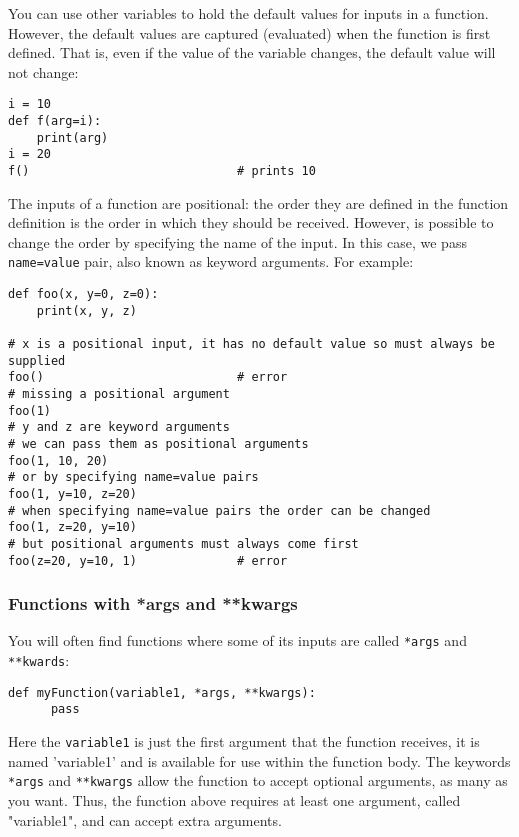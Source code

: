 \documentclass[12pt, a4paper]{article}
\begin{document}
You can use other variables to hold the default values for inputs in a function.
However, the default values are captured (evaluated) when the function is first defined.
That is, even if the value of the variable changes, the default value will not change:
\lstset{language=jupyter-python,label= ,caption= ,captionpos=b,numbers=none}
\begin{lstlisting}
i = 10
def f(arg=i):
    print(arg)
i = 20
f()                             # prints 10
\end{lstlisting}

The inputs of a function are positional: the order they are defined in the function definition is the order in which they should be received.
However, is possible to change the order by specifying the name of the input.
In this case, we pass \texttt{name=value} pair, also known as keyword arguments.
For example:
\lstset{language=jupyter-python,label= ,caption= ,captionpos=b,numbers=none}
\begin{lstlisting}
def foo(x, y=0, z=0):
    print(x, y, z)

# x is a positional input, it has no default value so must always be supplied
foo()                           # error
# missing a positional argument
foo(1)
# y and z are keyword arguments
# we can pass them as positional arguments
foo(1, 10, 20)
# or by specifying name=value pairs
foo(1, y=10, z=20)
# when specifying name=value pairs the order can be changed
foo(1, z=20, y=10)
# but positional arguments must always come first
foo(z=20, y=10, 1)              # error
\end{lstlisting}
\subsubsection{Functions with *args and **kwargs}
\label{sec:orgd87025b}
You will often find functions where some of its inputs are called \texttt{*args} and \texttt{**kwards}:
\lstset{language=jupyter-python,label= ,caption= ,captionpos=b,numbers=none}
\begin{lstlisting}
def myFunction(variable1, *args, **kwargs):
      pass
\end{lstlisting}
Here the \texttt{variable1} is just the first argument that the function receives, it is named 'variable1' and is available for use within the function body.
The keywords \texttt{*args} and \texttt{**kwargs} allow the function to accept optional arguments, as many as you want.
Thus, the function above requires at least one argument, called "variable1", and can accept extra arguments.
\end{document}
